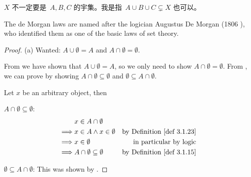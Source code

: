 \begin{note}
\(X\) 不一定要是\ \(A, B, C\) 的宇集。我是指\ \(A \cup B \cup C \subsetneq X\) 也可以。
\end{note}

\begin{remark}\label{remark 3.1.29}
The de Morgan laws are named after the logician Augustus De Morgan (1806 ), who identified them as one of the basic laws of set theory.
\end{remark}

\begin{proof}{(a)} Wanted: \(A \cup \emptyset = A\) and \(A \cap \emptyset = \emptyset\).

From  we have shown that \(A \cup \emptyset = A\), so we only need to show \(A \cap \emptyset = \emptyset\). From , we can prove by showing \(A \cap \emptyset \subseteq \emptyset\) and \(\emptyset \subseteq A \cap \emptyset\).

Let \(x\) be an arbitrary object, then

\(A \cap \emptyset \subseteq \emptyset\): 
\begin{align*}
         & x \in A \cap \emptyset \\
    \implies & x \in A \land x \in \emptyset & \text{by \DEF{3.1.23}} \\
    \implies & x \in \emptyset & \text{in particular by logic} \\
    \implies & A \cap \emptyset \subseteq \emptyset & \text{by \DEF{3.1.15}}
\end{align*}

\(\emptyset \subseteq A \cap \emptyset\): This was shown by .
\end{proof}

